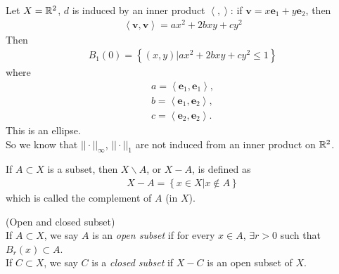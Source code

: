 \documentclass[a4paper]{article}
\begin{document}
\begin{eg}
Let $X=\mathbb{R}^2$, $d$ is induced by an inner product $\left<,\right>$: if $\mathbf{v}=x\mathbf{e}_1+y\mathbf{e}_2$, then
\begin{equation*}
\begin{aligned}
\left<\mathbf{v},\mathbf{v}\right> = ax^2 + 2bxy + cy^2
\end{aligned}
\end{equation*}
Then
\begin{equation*}
\begin{aligned}
B_1\left(0\right) = \left\{\left(x,y\right) | ax^2+2bxy+cy^2 \leq 1\right\}
\end{aligned}
\end{equation*}
where
\begin{equation*}
\begin{aligned}
a=\left<\mathbf{e}_1,\mathbf{e}_1\right>,\\
b=\left<\mathbf{e}_1,\mathbf{e}_2\right>,\\
c=\left<\mathbf{e}_2,\mathbf{e}_2\right>.
\end{aligned}
\end{equation*}
This is an ellipse.\\
So we know that $||\cdot ||_\infty$, $||\cdot ||_1$ are not induced from an inner product on $\mathbb{R}^2$.
\end{eg}

\begin{notation}
If $A\subset X$ is a subset, then $X\backslash A$, or $X-A$, is defined as
\begin{equation*}
\begin{aligned}
X-A = \left\{x\in X | x\not\in A\right\}
\end{aligned}
\end{equation*}
which is called the complement of $A$ (in $X$).
\end{notation}

\begin{defi} (Open and closed subset)\\
If $A\subset X$, we say $A$ is an \emph{open subset} if for every $x\in A$, $\exists r>0$ such that $B_r\left(x\right) \subset A$.\\
If $C\subset X$, we say $C$ is a \emph{closed subset} if $X-C$ is an open subset of $X$.
\end{defi}
\end{document}
